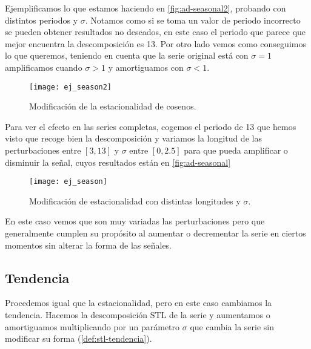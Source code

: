 Ejemplificamos lo que estamos haciendo en \autoref{fig:ad-seasonal2}, probando con distintos periodos y $\sigma$. Notamos como si se toma un valor de periodo incorrecto se pueden obtener resultados no deseados, en este caso el periodo que parece que mejor encuentra la descomposición es 13. Por otro lado vemos como conseguimos lo que queremos, teniendo en cuenta que la serie original está con $\sigma = 1$ amplificamos cuando $\sigma > 1$ y amortiguamos con $\sigma < 1$.

\begin{figure}[htpb]
  \centering
  \texttt{[image: ej\_season2]}
  \caption{Modificación de la estacionalidad de cosenos.}
  \label{fig:ad-seasonal2}
\end{figure}

Para ver el efecto en las series completas, cogemos el periodo de 13 que hemos visto que recoge bien la descomposición y variamos la longitud de las perturbaciones entre $[3, 13]$ y $\sigma$ entre $[0, 2.5]$ para que pueda amplificar o disminuir la señal, cuyos resultados están en \autoref{fig:ad-seasonal}

\begin{figure}[htpb]
  \centering
  \texttt{[image: ej\_season]}
  \caption{Modificación de estacionalidad con distintas longitudes y $\sigma$.}
  \label{fig:ad-seasonal}
\end{figure}

En este caso vemos que son muy variadas las perturbaciones pero que generalmente cumplen su propósito al aumentar o decrementar la serie en ciertos momentos sin alterar la forma de las señales.

\subsection{Tendencia}

Procedemos igual que la estacionalidad, pero en este caso cambiamos la tendencia. Hacemos la descomposición STL de la serie y aumentamos o amortiguamos multiplicando por un parámetro $\sigma$ que cambia la serie sin modificar su forma (\autoref{def:stl-tendencia}).

